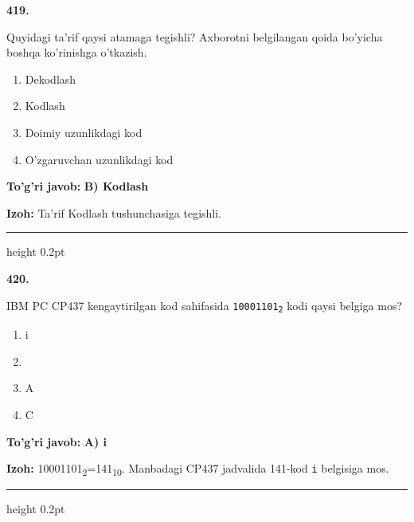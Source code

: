 \documentclass[10pt,a4paper,oneside]{article}
\begin{document}
\noindent\textbf{\color{ink}419.}
\par
Quyidagi ta'rif qaysi atamaga tegishli? Axborotni belgilangan qoida bo'yicha boshqa ko'rinishga o'tkazish.
\begin{enumerate}[label=\Alph*),leftmargin=9mm]
\item Dekodlash
\item Kodlash
\item Doimiy uzunlikdagi kod
\item O'zgaruvchan uzunlikdagi kod
\end{enumerate}
\begin{tcolorbox}[enhanced,breakable,colback=teal!4,colframe=teal!50!black,boxrule=0.5pt,arc=1.1mm,left=3mm,right=3mm,top=1.7mm,bottom=1.7mm,before skip=2mm,after skip=2mm]
\textbf{\color{teal}To'g'ri javob:} \textbf{B) Kodlash}
\par\smallskip
\textbf{Izoh:} Ta'rif Kodlash tushunchasiga tegishli.
\end{tcolorbox}
\vspace{2mm}\hrule height 0.2pt \vspace{3mm}

\noindent\textbf{\color{ink}420.}
\par
IBM PC CP437 kengaytirilgan kod sahifasida \texttt{10001101\textsubscript{2}} kodi qaysi belgiga mos?
\begin{enumerate}[label=\Alph*),leftmargin=9mm]
\item i
\item \textcopyright{}
\item A
\item C
\end{enumerate}
\begin{tcolorbox}[enhanced,breakable,colback=teal!4,colframe=teal!50!black,boxrule=0.5pt,arc=1.1mm,left=3mm,right=3mm,top=1.7mm,bottom=1.7mm,before skip=2mm,after skip=2mm]
\textbf{\color{teal}To'g'ri javob:} \textbf{A) i}
\par\smallskip
\textbf{Izoh:} 10001101\textsubscript{2}=141\textsubscript{1}\textsubscript{0}. Manbadagi CP437 jadvalida 141-kod \texttt{i} belgisiga mos.
\end{tcolorbox}
\vspace{2mm}\hrule height 0.2pt \vspace{3mm}
\end{document}
